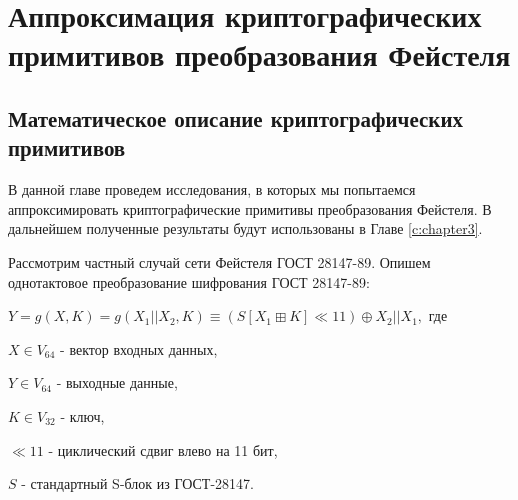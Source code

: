 \chapter{Аппроксимация криптографических примитивов преобразования Фейстеля}
\label{c:chapter2}
\section{Математическое описание криптографических примитивов}

В данной главе проведем исследования, в которых мы попытаемся аппроксимировать криптографические примитивы преобразования Фейстеля.
В дальнейшем полученные результаты будут использованы в Главе \ref{c:chapter3}.

\bigskip
Рассмотрим частный случай сети Фейстеля ГОСТ 28147-89. Опишем однотактовое преобразование шифрования ГОСТ 28147-89:
\bigskip

$Y = g(X, K) = g(X_1 || X_2, K) \equiv (S[X_1 \boxplus K] \ll 11) \oplus X_2 || X_1,$ где

$X \in V_{64}$ - вектор входных данных,

$Y \in V_{64}$ - выходные данные,

$K \in V_{32}$ - ключ,

$\ll 11$ - циклический сдвиг влево на 11 бит,

$S$ - стандартный S-блок из ГОСТ-28147.


